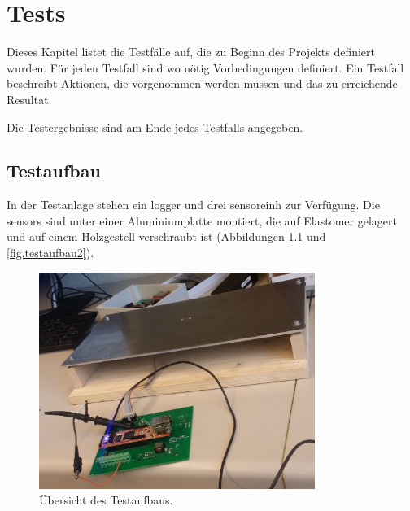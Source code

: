 %
%


\chapter{Tests}\label{chap.tests}

Dieses Kapitel listet die Testfälle auf, die zu Beginn des Projekts definiert wurden. Für jeden Testfall sind wo nötig Vorbedingungen definiert. Ein Testfall beschreibt Aktionen, die vorgenommen werden müssen und das zu erreichende Resultat.

Die Testergebnisse sind am Ende jedes Testfalls angegeben.

\section{Testaufbau}
In der Testanlage stehen ein \gls{logger} und drei \gls{sensoreinh} zur Verfügung. Die \glspl{sensor} sind unter einer Aluminiumplatte montiert, die auf Elastomer gelagert und auf einem Holzgestell verschraubt ist (Abbildungen \ref{fig.testaufbau1} und \ref{fig.testaufbau2}).

\begin{figure}
	\centering
		\includegraphics[width=0.8\textwidth]{images/fotos/testaufbau1.jpg}
	\caption{Übersicht des Testaufbaus.}
	\label{fig.testaufbau1}
\end{figure}


